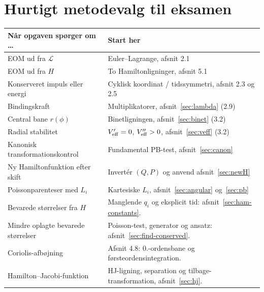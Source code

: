 \clearpage\section{Hurtigt metodevalg til eksamen}
\begin{center}\begin{tabular}{p{49mm}p{93mm}}\toprule Når opgaven spørger om \dots & Start her\\\midrule
EOM ud fra $\mathcal L$ & Euler--Lagrange, afsnit 2.1\\
EOM ud fra $H$ & To Hamiltonligninger, afsnit 5.1\\
Konserveret impuls eller energi & Cyklisk koordinat / tidssymmetri, afsnit 2.3 og 2.5\\
Bindingskraft & Multiplikatorer, afsnit~\ref{sec:lambda} (2.9)\\
Central bane $r(\phi)$ & Binetligningen, afsnit~\ref{sec:binet} (3.2)\\
Radial stabilitet & $V_{\rm eff}'=0$, $V_{\rm eff}''>0$, afsnit~\ref{sec:veff} (3.2)\\
Kanonisk transformationskontrol & Fundamental PB-test, afsnit~\ref{sec:canon}\\
Ny Hamiltonfunktion efter skift & Invertér $(Q,P)$ og anvend afsnit~\ref{sec:newH}\\
Poissonparenteser med $L_i$ & Kartesiske $L_i$, afsnit~\ref{sec:angular} og~\ref{sec:pb}\\
Bevarede størrelser fra $H$ & Manglende $q_i$ og eksplicit tid: afsnit~\ref{sec:ham-constants}.\\
Mindre oplagte bevarede størrelser & Poisson-test, generator og ansatz: afsnit~\ref{sec:find-conserved}.\\
Coriolis-afbøjning & Afsnit 4.8: 0.-ordensbane og førsteordensintegration.\\
Hamilton--Jacobi-funktion & HJ-ligning, separation og tilbage-transformation, afsnit~\ref{sec:hj}.\\\bottomrule\end{tabular}\end{center}

